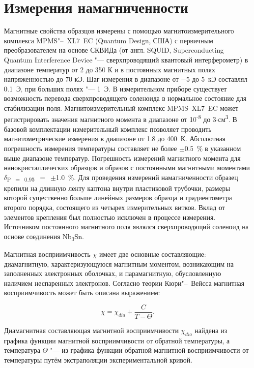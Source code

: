 \newpage
\section{Измерения намагниченности} \label{sect2_6}
Магнитные свойства образцов измерены с
помощью магнитоизмерительного комплекса
MPMS"--~XL7~EC (Quantum Design, США) с первичным преобразователем на основе СКВИДа (от англ. SQUID, Superconducting Quantum Interference Device "--- сверхпроводящий квантовый интерферометр) в диапазоне температур от 2 до 350 К и в постоянных магнитных полях напряженностью до 70 кЭ. Шаг измерения в диапазоне от $-$5 до 5~кЭ составлял 0.1~Э, при больших полях "--- 1~Э. В измерительном приборе существует возможность перевода сверхпроводящего соленоида в нормальное состояние для стабилизации поля.
Магнитоизмерительный комплекс MPMS--XL7~EC может регистрировать значения магнитного момента в диапазоне от 10\textsuperscript{-8} до 3$\cdot$см\textsuperscript{3}.
В базовой комплектации измерительный комплекс позволяет проводить магнитометрические измерения в диапазоне от 1.8 до 400~К.
Абсолютная погрешность измерения температуры составляет не более $\pm$0.5~\% в указанном выше диапазоне температур.
Погрешность измерений магнитного момента для нанокристаллических образцов и образов с постоянными магнитными моментами $\delta$\textsubscript{P~$=$~0.95}~$=$~$\pm$1.0~\%.
Для проведения измерений намагниченности образец крепили на длинную
ленту каптона внутри пластиковой трубочки, размеры которой существенно больше линейных размеров образца и градиентометра второго порядка,
состоящего из четырех измерительных витков.
Вклад от элементов крепления был полностью исключен в процессе измерения. Источником постоянного магнитного поля являлся сверхпроводящий
соленоид на основе соединения Nb\textsubscript{3}Sn.


Магнитная восприимчивость $\chi$ имеет две основные составляющие: диамагнитную, характеризующуюся магнитным моментом, возникающим на заполненных электронных оболочках, и парамагнитную, обусловленную наличием неспаренных электронов. Согласно теории Кюри"--~Вейсса магнитная
восприимчивость может быть описана выражением:

\begin{equation}
  \label{eq:equation2.1}
  \chi = \chi_{dia}+\frac{C}{T - \Theta}.
\end{equation}

Диамагнитная составляющая магнитной восприимчивости $\chi_{dia}$ найдена из графика функции
магнитной восприимчивости от обратной температуры, а температура $\Theta$ "--- из графика функции обратной магнитной восприимчивости от
температуры путём экстраполяции экспериментальной кривой.

